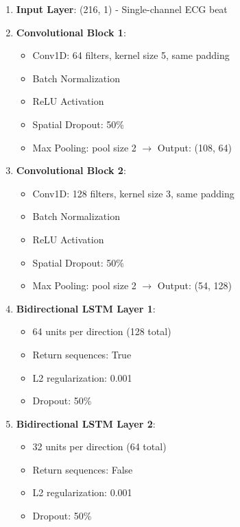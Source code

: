 \documentclass[12pt,a4paper]{article}
\begin{document}
\begin{enumerate}
    \item \textbf{Input Layer}: (216, 1) - Single-channel ECG beat
    
    \item \textbf{Convolutional Block 1}:
    \begin{itemize}
        \item Conv1D: 64 filters, kernel size 5, same padding
        \item Batch Normalization
        \item ReLU Activation
        \item Spatial Dropout: 50\%
        \item Max Pooling: pool size 2 $\rightarrow$ Output: (108, 64)
    \end{itemize}
    
    \item \textbf{Convolutional Block 2}:
    \begin{itemize}
        \item Conv1D: 128 filters, kernel size 3, same padding
        \item Batch Normalization
        \item ReLU Activation
        \item Spatial Dropout: 50\%
        \item Max Pooling: pool size 2 $\rightarrow$ Output: (54, 128)
    \end{itemize}
    
    \item \textbf{Bidirectional LSTM Layer 1}:
    \begin{itemize}
        \item 64 units per direction (128 total)
        \item Return sequences: True
        \item L2 regularization: 0.001
        \item Dropout: 50\%
    \end{itemize}
    
    \item \textbf{Bidirectional LSTM Layer 2}:
    \begin{itemize}
        \item 32 units per direction (64 total)
        \item Return sequences: False
        \item L2 regularization: 0.001
        \item Dropout: 50\%
    \end{itemize}
    

\end{enumerate}
\end{document}
